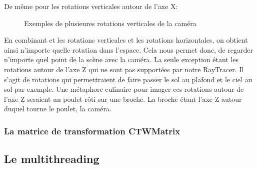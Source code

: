 \documentclass[11pt]{article}
\begin{document}
De même pour les rotations verticales autour de l'axe X:

\begin{figure}[h!]

	\caption{Exemples de plusieures rotations verticales de la caméra}
	\label{rotationCameraX}
\end{figure}
\FloatBarrier

En combinant et les rotations verticales et les rotations horizontales, on obtient ainsi n'importe quelle rotation dans l'espace. Cela nous permet donc, de regarder n'importe quel point de la scène avec la caméra. La seule exception étant les rotations autour de l'axe Z qui ne sont pas supportées par notre RayTracer. Il s'agit de rotations qui permettraient de faire passer le sol au plafond et le ciel au sol par exemple. Une métaphore culinaire pour imager ces rotations autour de l'axe Z seraient un poulet rôti sur une broche. La broche étant l'axe Z autour duquel tourne le poulet, la caméra.

\subsubsection{La matrice de transformation CTWMatrix}
\label{rotationsCamera}

\subsection{Le multithreading}
\end{document}
